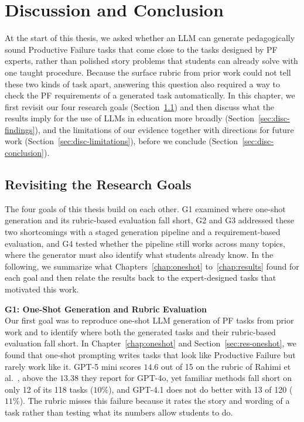 \chapter{Discussion and Conclusion}
\label{chap:discussion}

At the start of this thesis, we asked whether an LLM can generate pedagogically sound Productive Failure tasks that come close to the tasks designed by PF experts, rather than polished story problems that students can already solve with one taught procedure. Because the surface rubric from prior work could not tell these two kinds of task apart, answering this question also required a way to check the PF requirements of a generated task automatically. In this chapter, we first revisit our four research goals (Section~\ref{sec:disc-goals}) and then discuss what the results imply for the use of LLMs in education more broadly (Section~\ref{sec:disc-findings}), and the limitations of our evidence together with directions for future work (Section~\ref{sec:disc-limitations}), before we conclude (Section~\ref{sec:disc-conclusion}).

\section{Revisiting the Research Goals}
\label{sec:disc-goals}

The four goals of this thesis build on each other. G1 examined where one-shot generation and its rubric-based evaluation fall short, G2 and G3 addressed these two shortcomings with a staged generation pipeline and a requirement-based evaluation, and G4 tested whether the pipeline still works across many topics, where the generator must also identify what students already know. In the following, we summarize what Chapters~\ref{chap:oneshot} to~\ref{chap:results} found for each goal and then relate the results back to the expert-designed tasks that motivated this work.

\textbf{G1: One-Shot Generation and Rubric Evaluation}\\[0.2em]
Our first goal was to reproduce one-shot LLM generation of PF tasks from prior work and to identify where both the generated tasks and their rubric-based evaluation fall short. In Chapter~\ref{chap:oneshot} and Section~\ref{sec:res-oneshot}, we found that one-shot prompting writes tasks that look like Productive Failure but rarely work like it. GPT-5 mini scores $14.6$ out of 15 on the rubric of Rahimi et al.~\cite{rahimi2025}, above the $13.38$ they report for GPT-4o, yet familiar methods fall short on only 12 of its 118 tasks ($10\%$), and GPT-4.1 does not do better with 13 of 120 ($11\%$). The rubric misses this failure because it rates the story and wording of a task rather than testing what its numbers allow students to do.

